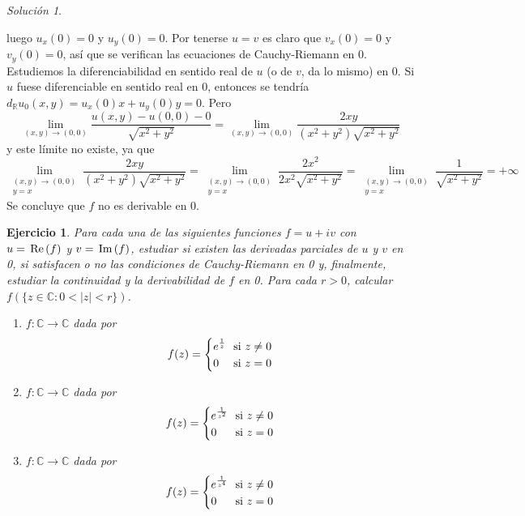 \documentclass[11pt]{report}
\newcommand{\R}{\mathbb R}
\newcommand{\C}{\mathbb C}
\newcommand{\pars}[1]{\left( #1 \right)} %
\renewcommand{\Re}[1]{\,\textup{Re}\pars{#1}}
\renewcommand{\Im}[1]{\,\textup{Im}\pars{#1}}
\newtheorem{exercise}{Ejercicio}
\theoremstyle{remark}
\newtheorem*{resolution}{Solución}
\begin{document}
\begin{resolution}
\begin{enumerate}
    luego $u_x(0)=0$ y $u_y(0)=0$. Por tenerse $u = v$ es claro que $v_x(0) = 0$ y $v_y(0)=0$, así que se verifican las ecuaciones de Cauchy-Riemann en $0$. Estudiemos la diferenciabilidad en sentido real de $u$ (o de $v$, da lo mismo) en 0. Si $u$ fuese diferenciable en sentido real en $0$, entonces se tendría $d_\R u_0(x,y) = u_x(0)x+u_y(0)y = 0$. Pero
    \[\lim_{(x,y) \to (0,0)} \frac{u(x,y)-u(0,0)-0}{\sqrt{x^2+y^2}} = \lim_{(x,y) \to (0,0)} \frac{2xy}{(x^2+y^2)\sqrt{x^2+y^2}}\]
    y este límite no existe, ya que
    \[\lim_{\substack{(x,y) \to (0,0) \\ y=x}} \frac{2xy}{(x^2+y^2)\sqrt{x^2+y^2}} = \lim_{\substack{(x,y) \to (0,0) \\ y=x}} \frac{2x^2}{2x^2\sqrt{x^2+y^2}} = \lim_{\substack{(x,y) \to (0,0) \\ y=x}} \frac{1}{\sqrt{x^2+y^2}} = +\infty\]
    Se concluye que $f$ no es derivable en $0$.
\end{enumerate}
\end{resolution}

\begin{exercise}
Para cada una de las siguientes funciones $f = u+iv$ con $u=\Re{f}$ y $v = \Im{f}$, estudiar si existen las derivadas parciales de $u$ y $v$ en 0, si satisfacen o no las condiciones de Cauchy-Riemann en 0 y, finalmente, estudiar la continuidad y la derivabilidad de $f$ en 0. Para cada $r >0$, calcular $f\pars{\{z \in \C \colon 0<|z|<r\}}$.
\begin{enumerate}
    \item $f \colon \C \to \C$ dada por
    \[f(z) = \left\{
    \begin{alignedat}{2}
        & e^{\frac{1}{z}} && \ \textup{ si } z \neq 0 \\
        & 0 && \ \textup{ si } z = 0
    \end{alignedat}
    \right.\]
    \item $f \colon \C \to \C$ dada por
    \[f(z) = \left\{
    \begin{alignedat}{2}
        & e^{\frac{1}{z^2}} && \ \textup{ si } z \neq 0 \\
        & 0 && \ \textup{ si } z = 0
    \end{alignedat}
    \right.\]
    \item $f \colon \C \to \C$ dada por
    \[f(z) = \left\{
    \begin{alignedat}{2}
        & e^{\frac{1}{z^4}} && \ \textup{ si } z \neq 0 \\
        & 0 && \ \textup{ si } z = 0
    \end{alignedat}
    \right.\]
\end{enumerate}
\end{exercise}
\end{document}
